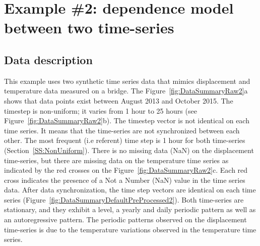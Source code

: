 \section{Example \#2: dependence model between two time-series}
\label{S:ExampleDispTemp}

\subsection{Data description}

This example uses two synthetic time series data that mimics displacement and temperature data measured on a bridge.
The  Figure~\ref{fig:DataSummaryRaw2}a shows that data points exist between August 2013 and October 2015.
The timestep is non-uniform; it varies from 1 hour to 25 hours (see Figure~\ref{fig:DataSummaryRaw2}b). 
The timestep vector is not identical on each time series. 
It means that the time-series are not synchronized between each other.
The most frequent (i.e referent) time step is 1 hour for both time-series (Section~\ref{SS:NonUniform}).
There is no missing data (NaN) on the displacement time-series, but there are missing data on the temperature time series as indicated by the red crosses on the Figure~\ref{fig:DataSummaryRaw2}c.
Each red cross indicates the presence of a Not a Number (NaN) value in the time series data.
After data synchronization, the time step vectors are identical on each time series (Figure~\ref{fig:DataSummaryDefaultPreProcessed2}).
Both time-series are stationary, and they exhibit a level, a yearly and daily periodic pattern as well as an autoregressive pattern.
The periodic patterns observed on the displacement time-series is due to the temperature variations observed in the temperature time series.

